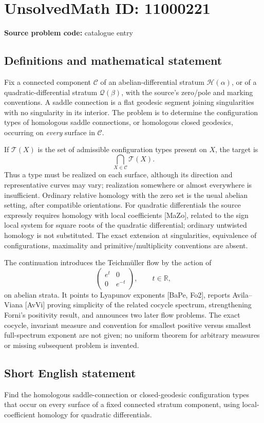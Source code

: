 \documentclass[11pt]{article}
\newcommand{\R}{\mathbb{R}}
\begin{document}
\section*{UnsolvedMath ID: 11000221}
\textbf{Source problem code:} catalogue entry
\subsection{Definitions and mathematical statement}
Fix a connected component \(\mathcal C\) of an abelian-differential stratum \(\mathcal H(\alpha)\), or of a quadratic-differential stratum \(\mathcal Q(\beta)\), with the source's zero/pole and marking conventions. A saddle connection is a flat geodesic segment joining singularities with no singularity in its interior. The problem is to determine the configuration types of homologous saddle connections, or homologous closed geodesics, occurring on \emph{every} surface in \(\mathcal C\).

If \(\mathscr T(X)\) is the set of admissible configuration types present on \(X\), the target is
\[
 \bigcap_{X\in\mathcal C}\mathscr T(X).
\]
Thus a type must be realized on each surface, although its direction and representative curves may vary; realization somewhere or almost everywhere is insufficient. Ordinary relative homology with the zero set is the usual abelian setting, after compatible orientations. For quadratic differentials the source expressly requires homology with local coefficients [MaZo], related to the sign local system for square roots of the quadratic differential; ordinary untwisted homology is not substituted. The exact extension at singularities, equivalence of configurations, maximality and primitive/multiplicity conventions are absent.

The continuation introduces the Teichm\"uller flow by the action of
\[
 \begin{pmatrix}e^t&0\\0&e^{-t}\end{pmatrix},\qquad t\in\R,
\]
on abelian strata. It points to Lyapunov exponents [BaPe, Fo2], reports Avila--Viana [AvVi] proving simplicity of the related cocycle spectrum, strengthening Forni's positivity result, and announces two later flow problems. The exact cocycle, invariant measure and convention for smallest positive versus smallest full-spectrum exponent are not given; no uniform theorem for arbitrary measures or missing subsequent problem is invented.
\subsection{Short English statement}
Find the homologous saddle-connection or closed-geodesic configuration types that occur on every surface of a fixed connected stratum component, using local-coefficient homology for quadratic differentials.
\end{document}
